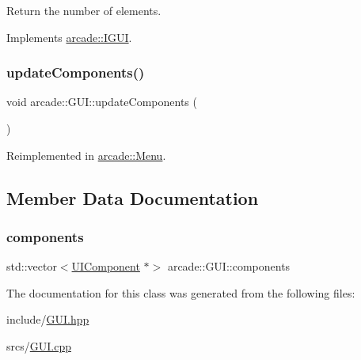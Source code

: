 Return the number of elements. 



Implements \hyperlink{classarcade_1_1_i_g_u_i_a5e9b36772c4affcc58243880e6d51d62}{arcade\+::\+I\+G\+UI}.

\mbox{\label{classarcade_1_1_g_u_i_abdf6ff80e7176b8a0e9c4561c5bfbf10}} 
\subsubsection{\texorpdfstring{update\+Components()}{updateComponents()}}
{\footnotesize\ttfamily void arcade\+::\+G\+U\+I\+::update\+Components (\begin{DoxyParamCaption}{ }\end{DoxyParamCaption})\hspace{0.3cm}{\ttfamily [virtual]}}



Reimplemented in \hyperlink{classarcade_1_1_menu_a63906aaba91a3be7b0f4f8dcc46e87f4}{arcade\+::\+Menu}.



\subsection{Member Data Documentation}
\mbox{\label{classarcade_1_1_g_u_i_a190c384b099301972698f9bb410474de}} 
\subsubsection{\texorpdfstring{components}{components}}
{\footnotesize\ttfamily std\+::vector$<$\hyperlink{classarcade_1_1_u_i_component}{U\+I\+Component} $\ast$$>$ arcade\+::\+G\+U\+I\+::components\hspace{0.3cm}{\ttfamily [protected]}}



The documentation for this class was generated from the following files\+:\begin{DoxyCompactItemize}
\item 
include/\hyperlink{_g_u_i_8hpp}{G\+U\+I.\+hpp}\item 
srcs/\hyperlink{_g_u_i_8cpp}{G\+U\+I.\+cpp}\end{DoxyCompactItemize}
